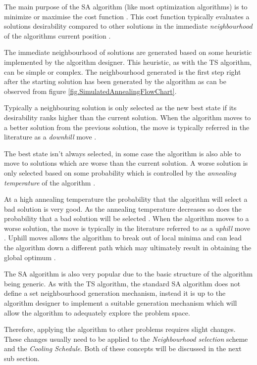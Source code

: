The main purpose of the SA algorithm (like most optimization algorithms) is to minimize or maximise the cost function \cite{SASingleMultiObj}. This cost function typically evaluates a solutions desirability compared to other solutions in the immediate \emph{neighbourhood} of the algorithms current position \cite{TheoPraticalSA}. 

The immediate neighbourhood of solutions are generated based on some heuristic implemented by the algorithm designer\cite{AIModernApproach}. This heuristic, as with the TS algorithm, can be simple or complex\cite{}. The neighbourhood generated is the first step right after the starting solution has been generated by the algorithm as can be observed from figure \ref{fig.SimulatedAnnealingFlowChart}.

Typically a neighbouring solution is only selected as the new best state if its desirability ranks higher than the current solution. When the algorithm moves to a better solution from the previous solution, the move is typically referred in the literature as a \emph{downhill} move \cite{CurveFittingSA}.

The best state isn't always selected, in some case the algorithm is also able to move to solutions which are worse than the current solution. A worse solution is only selected based on some probability which is controlled by the \emph{annealing temperature} of the algorithm \cite{TheoPraticalSA}. 

At a high annealing temperature the probability that the algorithm will select a bad solution is very good. As the annealing temperature decreases so does the probability that a bad solution will be selected \cite{CurveFittingSA}. When the algorithm moves to a worse solution, the move is typically in the literature referred to as a \emph{uphill} move \cite{CurveFittingSA}. Uphill moves allows the algorithm to break out of local minima and can lead the algorithm down a different path which may ultimately result in obtaining the global optimum \cite{SASingleMultiObj}. 

The SA algorithm is also very popular due to the basic structure of the algorithm being generic\cite{VariousCoolingSA}. As with the TS algorithm, the standard SA algorithm does not define a set neighbourhood generation mechanism, instead it is up to the algorithm designer to implement a suitable generation mechanism which will allow the algorithm to adequately explore the problem space\cite{VariousCoolingSA}. 

Therefore, applying the algorithm to other problems requires slight changes. These changes usually need to be applied to the \emph{Neighbourhood selection} scheme and the \emph{Cooling Schedule}\cite{VariousCoolingSA,DormRoomSA}. Both of these concepts will be discussed in the next sub section.

